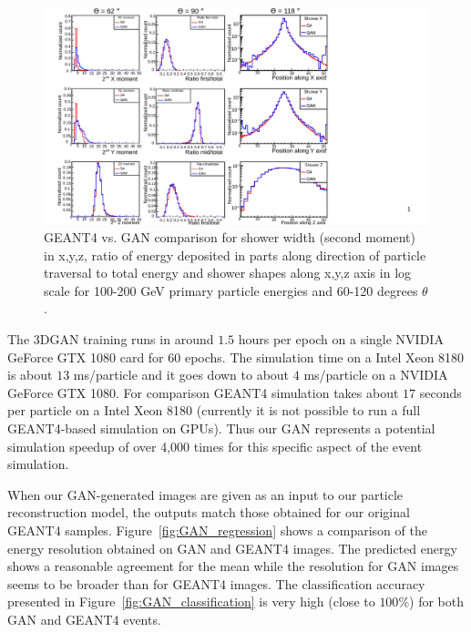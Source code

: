 \begin{figure}
    \centering
    \includegraphics[width=\textwidth, trim={1cm 0cm 7cm 0cm}, clip=true]{Images/Calo/features_2_rev.pdf}
    \caption{GEANT4 vs. GAN comparison for shower width (second
      moment) in x,y,z, ratio of energy deposited in parts along
      direction of particle traversal to total energy and shower
      shapes along x,y,z axis in log scale for 100-200 GeV primary
      particle energies and 60-120 degrees $\theta$.
      \label{fig:GAN_features2}}
\end{figure}

The 3DGAN training runs in around $1.5$ hours per epoch on a single NVIDIA GeForce GTX 1080 card for $60$ epochs. The simulation  time  on a Intel  Xeon 8180  is about $13$ ms/particle  and it goes down to about $4$ ms/particle on a NVIDIA  GeForce  GTX  1080. For  comparison  GEANT4  simulation takes  about $17$ seconds  per  particle on  a  Intel  Xeon  8180 (currently  it  is  not  possible  to  run a full  GEANT4-based  simulation  on  GPUs). Thus our GAN represents a potential simulation speedup of over 4,000 times for this specific aspect of the event simulation.

When our GAN-generated images are given as an input to our particle reconstruction model, the outputs match those obtained for our original GEANT4 samples. Figure~\ref{fig:GAN_regression} shows a comparison of the energy resolution obtained on GAN and GEANT4 images. The predicted energy shows a reasonable agreement for the mean while the resolution for GAN images seems to be broader than for GEANT4 images. The classification accuracy presented in Figure~\ref{fig:GAN_classification} is very high (close to $100\%$) for both GAN and GEANT4 events.

